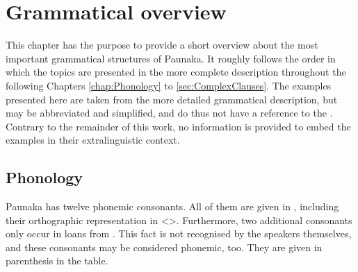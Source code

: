 
\chapter{Grammatical overview}\label{chap:Overview}

This chapter has the purpose to provide a short overview about the most important grammatical structures of Paunaka. It roughly follows the order in which the topics are presented in the more complete description throughout the following Chapters \ref{chap:Phonology} to \ref{sec:ComplexClauses}. The examples presented here are taken from the more detailed grammatical description, but may be abbreviated and simplified, and do thus not have a reference to the . Contrary to the remainder of this work, no information is provided to embed the examples in their extralinguistic context.


\section{Phonology}\label{sec:O_Phonology}
Paunaka has twelve phonemic consonants. All of them are given in , including their orthographic representation in <>. Furthermore, two additional consonants only occur in loans from . This fact is not recognised by the speakers themselves, and these consonants may be considered phonemic, too. They are given in parenthesis in the table.

\begin{table}[htbp] 
\caption{Consonant inventory with orthographic representation}
\label{table:O_consonants}
\end{table}

